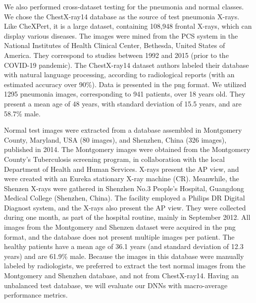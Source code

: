 \documentclass[fleqn,10pt]{wlscirep}
\begin{document}
{We also performed cross-dataset testing for the pneumonia and normal classes. We chose the ChestX-ray14 database\cite{chex14} as the source of test pneumonia X-rays. Like CheXPert, it is a large dataset, containing 108,948 frontal X-rays, which can display various diseases. The images were mined from the PCS system in the National Institutes of Health Clinical Center, Bethesda, United States of America. They correspond to studies between 1992 and 2015 (prior to the COVID-19 pandemic). The ChestX-ray14 dataset authors\cite{chex14} labeled their database with natural language processing, according to radiological reports (with an estimated accuracy over 90\%). Data is presented in the png format. We utilized 1295 pneumonia images, corresponding to 941 patients, over 18 years old. They present a mean age of 48 years, with standard deviation of 15.5 years, and are 58.7\% male. 

Normal test images were extracted from a database assembled in Montgomery County, Maryland, USA (80 images), and Shenzhen, China (326 images)\cite{ChineseDataset1}, published in 2014. The Montgomery images were obtained from the Montgomery County’s Tuberculosis screening program, in collaboration with the local Department of Health and Human Services. X-rays present the AP view, and were created with an Eureka stationary X-ray machine (CR). Meanwhile, the Shenzen X-rays were gathered in Shenzhen No.3 People’s Hospital, Guangdong Medical College (Shenzhen, China). The facility employed a Philips DR Digital Diagnost system, and the X-rays also present the AP view. They were collected during one month, as part of the hospital routine, mainly in September 2012. All images from the Montgomery and Shenzen dataset were acquired in the png format, and the database does not present multiple images per patient. The healthy patients have a mean age of 36.1 years (and standard deviation of 12.3 years) and are 61.9\% male. Because the images in this database were manually labeled by radiologists, we preferred to extract the test normal images from the Montgomery and Shenzhen database, and not from ChestX-ray14. Having an unbalanced test database, we will evaluate our DNNs with macro-average performance metrics.

}
\end{document}
